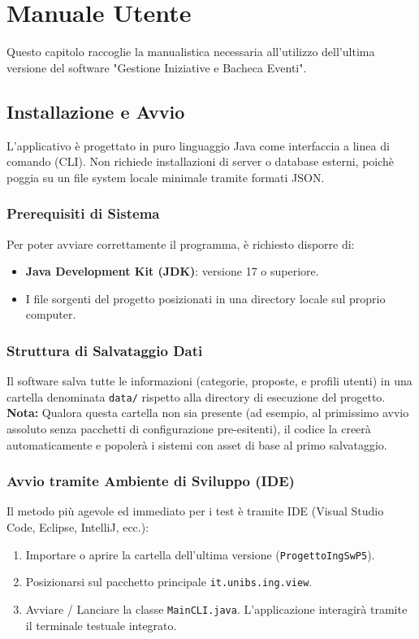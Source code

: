 \chapter{Manuale Utente}

Questo capitolo raccoglie la manualistica necessaria all'utilizzo dell'ultima versione del software "Gestione Iniziative e Bacheca Eventi".

\section{Installazione e Avvio}

L'applicativo è progettato in puro linguaggio Java come interfaccia a linea di comando (CLI). Non richiede installazioni di server o database esterni, poichè poggia su un file system locale minimale tramite formati JSON.

\subsection{Prerequisiti di Sistema}
Per poter avviare correttamente il programma, è richiesto disporre di:
\begin{itemize}
    \item \textbf{Java Development Kit (JDK)}: versione 17 o superiore.
    \item I file sorgenti del progetto posizionati in una directory locale sul proprio computer.
\end{itemize}

\subsection{Struttura di Salvataggio Dati}
Il software salva tutte le informazioni (categorie, proposte, e profili utenti) in una cartella denominata \texttt{data/} rispetto alla directory di esecuzione del progetto. 
\textbf{Nota:} Qualora questa cartella non sia presente (ad esempio, al primissimo avvio assoluto senza pacchetti di configurazione pre-esitenti), il codice la creerà automaticamente e popolerà i sistemi con asset di base al primo salvataggio.

\subsection{Avvio tramite Ambiente di Sviluppo (IDE)}
Il metodo più agevole ed immediato per i test è tramite IDE (Visual Studio Code, Eclipse, IntelliJ, ecc.):
\begin{enumerate}
    \item Importare o aprire la cartella dell'ultima versione (\texttt{ProgettoIngSwP5}).
    \item Posizionarsi sul pacchetto principale \texttt{it.unibs.ing.view}.
    \item Avviare / Lanciare la classe \texttt{MainCLI.java}. L'applicazione interagirà tramite il terminale testuale integrato.
\end{enumerate}

